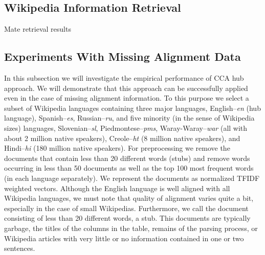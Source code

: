 \documentclass[twoside,11pt]{article}
\newcommand{\oldText}[1]{\textcolor{red}{#1:}\color{blue}}
\begin{document}
\subsection{Wikipedia Information Retrieval}

Mate retrieval results

\subsection{Experiments With Missing Alignment Data}
 In this subsection we will investigate the empirical performance of CCA hub approach. We will demonstrate that this approach can be successfully applied even in the case of missing alignment information.
 To this purpose we select a subset of Wikipedia languages containing three major languages, English--\emph{en} (hub language), Spanish--\emph{es}, Russian--\emph{ru}, and five minority (in the sense of Wikipedia sizes) languages, Slovenian--\emph{sl}, Piedmontese--\emph{pms}, Waray-Waray--\emph{war} (all with about 2 million native speakers), Creole--\emph{ht} (8 million native speakers), and Hindi--\emph{hi} (180 million native speakers). For preprocessing we remove the documents that contain less than 20 different words (stubs) and remove words occurring in less than 50 documents as well as the top 100 most frequent words (in each language separately). We represent the documents as normalized TFIDF\cite{Salton88term-weightingapproaches} weighted vectors.
 Although the English language is well aligned with all Wikipedia languages, we must note that quality of alignment varies quite a bit, especially in the case of small Wikipedias.
 Furthermore, we call the document consisting of less than 20 different words, a stub. This documents are typically garbage, the titles of the columns in the table, remains of the parsing process, or Wikipedia articles with very little or no information contained in one or two sentences.
\end{document}
